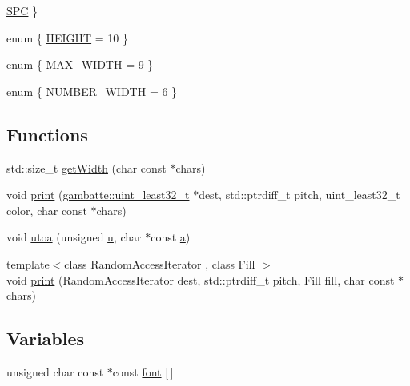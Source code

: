 \begin{DoxyCompactItemize}
\hyperlink{namespacebitmapfont_aa985ecc356f031589865e53b3475a2ddae71a11a4911ca3c87110436c43543ad8}{S\+PC}
 \}
\item 
enum \{ \hyperlink{namespacebitmapfont_adcfe4550c64eee8fa86550505cc2da7ca5a377f274522b368f96f18c7cc4aaabe}{H\+E\+I\+G\+HT} = 10
 \}
\item 
enum \{ \hyperlink{namespacebitmapfont_aff842bca09d4d497d7bafc1f7441c934ab93f490880f5db8eb24cb59d50747801}{M\+A\+X\+\_\+\+W\+I\+D\+TH} = 9
 \}
\item 
enum \{ \hyperlink{namespacebitmapfont_aaa5cc398faeeb4a2db9da196b2c9f90ea88933618eb3f095610cf3195ffa50618}{N\+U\+M\+B\+E\+R\+\_\+\+W\+I\+D\+TH} = 6
 \}
\end{DoxyCompactItemize}
\subsection*{Functions}
\begin{DoxyCompactItemize}
\item 
std\+::size\+\_\+t \hyperlink{namespacebitmapfont_a682473073f936accda9fd8ef3c585cf8}{get\+Width} (char const $\ast$chars)
\item 
void \hyperlink{namespacebitmapfont_a2512dfd9a49deea691d466d40408e182}{print} (\hyperlink{namespacegambatte_a0639f09fccfbbd5a8e0796318768e370}{gambatte\+::uint\+\_\+least32\+\_\+t} $\ast$dest, std\+::ptrdiff\+\_\+t pitch, uint\+\_\+least32\+\_\+t color, char const $\ast$chars)
\item 
void \hyperlink{namespacebitmapfont_ab29f48ccd8f7f70e8ff8ef37ed432195}{utoa} (unsigned \hyperlink{namespacebitmapfont_aa985ecc356f031589865e53b3475a2ddadde2320a0c8eb4864a02df90f68cad7f}{u}, char $\ast$const \hyperlink{namespacebitmapfont_aa985ecc356f031589865e53b3475a2dda0203113be18cffc12093057c0de88e7c}{a})
\item 
{\footnotesize template$<$class Random\+Access\+Iterator , class Fill $>$ }\\void \hyperlink{namespacebitmapfont_a69a6043b076e5288453f3eae8ae59645}{print} (Random\+Access\+Iterator dest, std\+::ptrdiff\+\_\+t pitch, Fill fill, char const $\ast$chars)
\end{DoxyCompactItemize}
\subsection*{Variables}
\begin{DoxyCompactItemize}
\item 
unsigned char const  $\ast$const \hyperlink{namespacebitmapfont_adb0f5b27148a985b29c91a4f21631b01}{font} \mbox{[}$\,$\mbox{]}
\end{DoxyCompactItemize}


